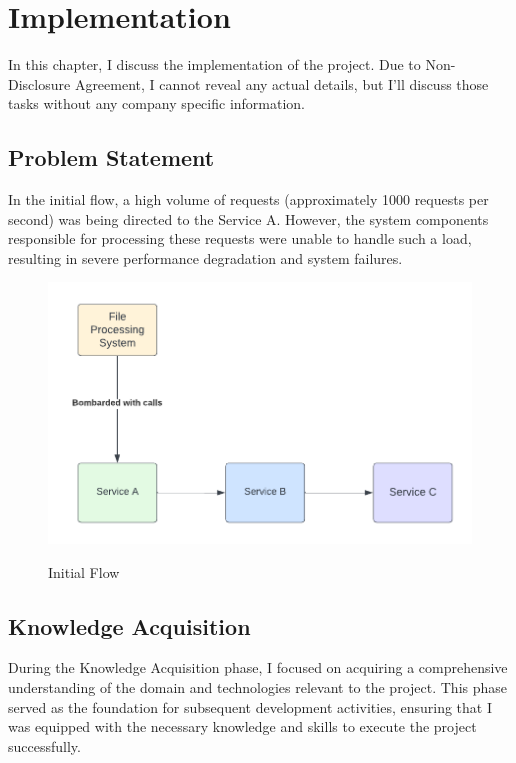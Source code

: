 \documentclass[12pt,a4paper]{report}
\begin{document}
\chapter{Implementation}

In this chapter, I discuss the implementation of the project. Due to Non-Disclosure Agreement, I cannot reveal any actual details, but I’ll discuss those tasks without any company specific information.


\section{Problem Statement}

In the initial flow, a high volume of requests (approximately 1000 requests per second) was being directed to the Service A. However, the system components responsible for processing these requests were unable to handle such a load, resulting in severe performance degradation and system failures.

\begin{figure}[h]
  \centering
  \includegraphics[width=5.5in]{initial flow.png}\\[1.5cm]
  \caption{Initial Flow}
  \label{fig:example}
\end{figure}



\section{Knowledge Acquisition}

During the Knowledge Acquisition phase, I focused on acquiring a comprehensive understanding of the domain and technologies relevant to the project. This phase served as the foundation for subsequent development activities, ensuring that I was equipped with the necessary knowledge and skills to execute the project successfully.
\end{document}
